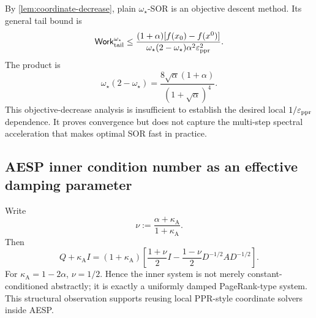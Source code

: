 By \cref{lem:coordinate-decrease}, plain \(\omega_\star\)-SOR is an objective
descent method.  Its general tail bound is
\begin{equation}
    \mathsf{Work}_{\rm tail}^{\omega_\star}
    \leq
    \frac{(1+\alpha)[f(x_0)-f(x^0)]}
         {\omega_\star(2-\omega_\star)\alpha^2\varepsilon_{\mathrm{ppr}}^2}.
    \label{eq:omega-star-objective-work}
\end{equation}
The product is
\begin{equation}
    \omega_\star(2-\omega_\star)
    =\frac{8\sqrt\alpha(1+\alpha)}{(1+\sqrt\alpha)^4}.
    \label{eq:omega-star-product}
\end{equation}
This objective-decrease analysis is insufficient to establish the desired
local \(1/\varepsilon_{\mathrm{ppr}}\) dependence.  It proves convergence but does not capture the
multi-step spectral acceleration that makes optimal SOR fast in practice.

\subsection{AESP inner condition number as an effective damping parameter}

Write
\begin{equation}
    \nu:=\frac{\alpha+\kappa_{\mathrm A}}{1+\kappa_{\mathrm A}}.
    \label{eq:effective-damping}
\end{equation}
Then
\begin{equation}
    Q+\kappa_{\mathrm A} I
    =(1+\kappa_{\mathrm A})
      \left[
        \frac{1+\nu}{2}I-
        \frac{1-\nu}{2}D^{-1/2}AD^{-1/2}
      \right].
    \label{eq:shifted-ppr-form}
\end{equation}
For \(\kappa_{\mathrm A}=1-2\alpha\), \(\nu=1/2\).  Hence the inner system is
not merely constant-conditioned abstractly; it is exactly a uniformly damped
PageRank-type system.  This structural observation supports reusing local
PPR-style coordinate solvers inside AESP.
